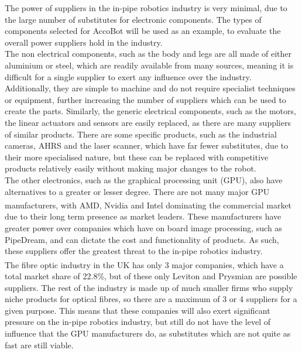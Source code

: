 \documentclass[11pt]{article}		%
\newcommand{\supercite}[1]{\textsuperscript{\cite{#1}}}		%
\begin{document}
				The power of suppliers in the in-pipe robotics industry is very minimal, due to the large number of substitutes for electronic components.
				The types of components selected for AccoBot will be used as an example, to evaluate the overall power suppliers hold in the industry.
				\\
                \hspace*{3ex}The non electrical components, such as the body and legs are all made of either aluminium or steel, which are readily available from many sources, meaning it is difficult for a single supplier to exert any influence over the industry.
				Additionally, they are simple to machine and do not require specialist techniques or equipment, further increasing the number of suppliers which can be used to create the parts.
				Similarly, the generic electrical components, such as the motors, the linear actuators and sensors are easily replaced, as there are many suppliers of similar products.
				There are some specific products, such as the industrial cameras, AHRS and the laser scanner, which have far fewer substitutes, due to their more specialised nature, but these can be replaced with competitive products relatively easily without making major changes to the robot.
				\\
                \hspace*{3ex}The other electronics, such as the graphical processing unit (GPU), also have alternatives to a greater or lesser degree.
				There are not many major GPU manufacturers, with AMD, Nvidia and Intel dominating the commercial market\supercite{rake2020graphic} due to their long term presence as market leaders.
				These manufacturers have greater power over companies which have on board image processing, such as PipeDream, and can dictate the cost and functionality of  products.
				As such, these suppliers offer the greatest threat to the in-pipe robotics industry.
				\\
                \hspace*{3ex}The fibre optic industry in the UK has only 3 major companies\supercite{neve2020fibreoptic}, which have a total market share of 22.8\%, but of these only Leviton and Prysmian are possible suppliers.
				The rest of the industry is made up of much smaller firms who supply niche products for optical fibres, so there are a maximum of 3 or 4 suppliers for a given purpose.
				This means that these companies will also exert significant pressure on the in-pipe robotics industry, but still do not have the level of influence that the GPU manufacturers do, as substitutes which are not quite as fast are still viable.
\end{document}
